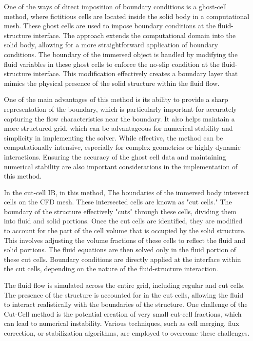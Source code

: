 One of the ways of direct imposition of boundary conditions is a ghost-cell method, where fictitious cells are located inside the solid body in a computational mesh. These ghost cells are used to impose boundary conditions at the fluid-structure interface. The approach extends the computational domain into the solid body, allowing for a more straightforward application of boundary conditions. The boundary of the immersed object is handled by modifying the fluid variables in these ghost cells to enforce the no-slip condition at the fluid-structure interface. This modification effectively creates a boundary layer that mimics the physical presence of the solid structure within the fluid flow. 

One of the main advantages of this method is its ability to provide a sharp representation of the boundary, which is particularly important for accurately capturing the flow characteristics near the boundary. It also helps maintain a more structured grid, which can be advantageous for numerical stability and simplicity in implementing the solver. While effective, the method can be computationally intensive, especially for complex geometries or highly dynamic interactions. Ensuring the accuracy of the ghost cell data and maintaining numerical stability are also important considerations in the implementation of this method.

In the cut-cell IB, in this method, The boundaries of the immersed body intersect cells on the CFD mesh. These intersected cells are known as "cut cells." The boundary of the structure effectively "cuts" through these cells, dividing them into fluid and solid portions. Once the cut cells are identified, they are modified to account for the part of the cell volume that is occupied by the solid structure. This involves adjusting the volume fractions of these cells to reflect the fluid and solid portions. The fluid equations are then solved only in the fluid portion of these cut cells. Boundary conditions are directly applied at the interface within the cut cells, depending on the nature of the fluid-structure interaction.

The fluid flow is simulated across the entire grid, including regular and cut cells. The presence of the structure is accounted for in the cut cells, allowing the fluid to interact realistically with the boundaries of the structure. One challenge of the Cut-Cell method is the potential creation of very small cut-cell fractions, which can lead to numerical instability. Various techniques, such as cell merging, flux correction, or stabilization algorithms, are employed to overcome these challenges. 

